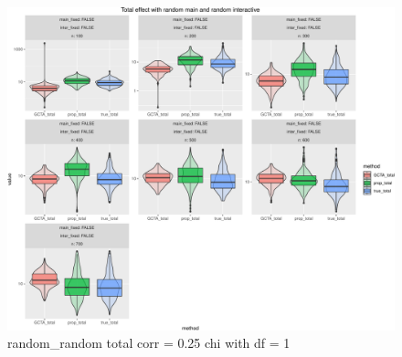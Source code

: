 \documentclass[]{article}
\begin{document}
\begin{figure}
\centering
\includegraphics{Decorrelation_method_and_their_effect_on_proposed_method_files/figure-latex/random_random_sim_red-1.pdf}
\caption{random\_random total corr = 0.25 chi with df = 1}
\end{figure}
\end{document}
